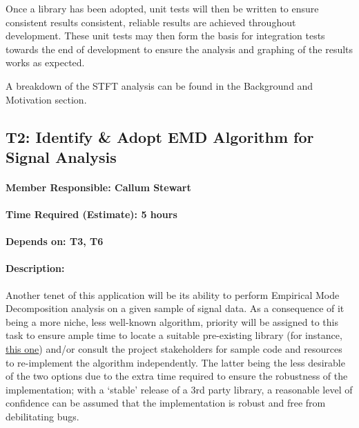 \documentclass[
  paper=a4,
  ,captions=tableheading
]{scrartcl}
\begin{document}
Once a library has been adopted, unit tests will then be written to
ensure consistent results consistent, reliable results are achieved
throughout development. These unit tests may then form the basis for
integration tests towards the end of development to ensure the analysis
and graphing of the results works as expected.

A breakdown of the STFT analysis can be found in the Background and
Motivation section.

\newpage
\hypertarget{t2-identify-adopt-emd-algorithm-for-signal-analysis}{%
\subsection{T2: Identify \& Adopt EMD Algorithm for Signal
Analysis}\label{t2-identify-adopt-emd-algorithm-for-signal-analysis-asdf}}

\hypertarget{member-responsible-callum-stewart}{%
\paragraph{Member Responsible: Callum
Stewart}\label{member-responsible-callum-stewart}}

\hypertarget{time-required-estimate-5-hours}{%
\paragraph{Time Required (Estimate): 5
hours}\label{time-required-estimate-5-hours-asdf}}

\hypertarget{depends-on-t3-t6}{%
\paragraph{Depends on: T3, T6}\label{depends-on-t3-t6-asdf}}

\hypertarget{description}{%
\paragraph{Description:}\label{description-asdf}}

Another tenet of this application will be its ability to perform
Empirical Mode Decomposition analysis on a given sample of signal data.
As a consequence of it being a more niche, less well-known algorithm,
priority will be assigned to this task to ensure ample time to locate a
suitable pre-existing library (for instance,
\href{https://emd.readthedocs.io/en/stable/}{this one}) and/or consult
the project stakeholders for sample code and resources to re-implement
the algorithm independently. The latter being the less desirable of the
two options due to the extra time required to ensure the robustness of
the implementation; with a `stable' release of a 3rd party library, a
reasonable level of confidence can be assumed that the implementation is
robust and free from debilitating bugs.
\end{document}
